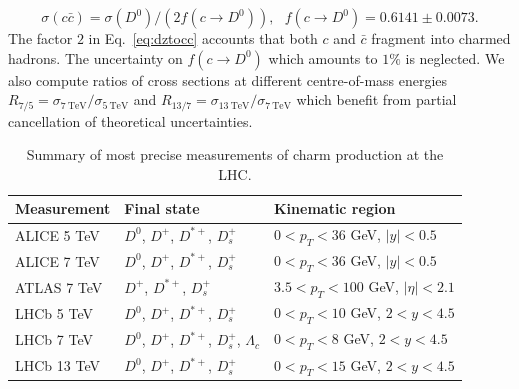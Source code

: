 \documentclass[12pt,a4paper]{article}
\newcommand{\dz}{\ensuremath{D^0}\xspace}
\newcommand{\dch}{\ensuremath{D^{+}}\xspace}
\newcommand{\dstar}{\ensuremath{D^{*+}}\xspace}
\newcommand{\ds}{\ensuremath{D_s^{+}}\xspace}
\newcommand{\lamc}{\ensuremath{\Lambda_{c}}\xspace}
\begin{document}
\begin{equation}
\sigma({c\bar{c}}) = \sigma({\dz}) / (2f(c \to \dz)),~~~f(c \to \dz) = 0.6141 \pm 0.0073.
\label{eq:dztocc}
\end{equation}
The factor $2$ in Eq.~\ref{eq:dztocc} accounts that both $c$ and $\bar{c}$ fragment into charmed hadrons.
The uncertainty on $f(c \to \dz)$ which amounts to $1\%$ is neglected.
  We also compute ratios of cross sections at different centre-of-mass energies $R_{7/5} = \sigma_{7~\textrm{TeV}} / \sigma_{5~\textrm{TeV}}$ and $R_{13/7} = \sigma_{13~\textrm{TeV}} / \sigma_{7~\textrm{TeV}}$ which benefit from partial cancellation of theoretical uncertainties.
\begin{table}
\setlength{\tabcolsep}{8pt}
\renewcommand{\arraystretch}{1.35}
\begin{tabular}{lll}
    \hline
    Measurement & Final state & Kinematic region \\
    \hline
    ALICE 5 TeV~\cite{Acharya:2019mgn} & \dz, \dch, \dstar, \ds & $0 < p_T < 36$ GeV, $|y|<0.5$ \\
    ALICE 7 TeV~\cite{Acharya:2019mgn} & \dz, \dch, \dstar, \ds & $0 < p_T < 36$ GeV, $|y|<0.5$ \\
    ATLAS 7 TeV~\cite{Aad:2015zix} & \dch, \dstar, \ds & $3.5 < p_T < 100$ GeV, $|\eta|<2.1$ \\
    LHCb 5 TeV~\cite{Aaij:2016jht} & \dz, \dch, \dstar, \ds & $0 < p_T < 10$ GeV, $2<y<4.5$ \\
    LHCb 7 TeV~\cite{Aaij:2013mga} & \dz, \dch, \dstar, \ds, \lamc & $0 < p_T < 8$ GeV, $2<y<4.5$ \\
    LHCb 13 TeV~\cite{Aaij:2015bpa} & \dz, \dch, \dstar, \ds & $0 < p_T < 15$ GeV, $2<y<4.5$ \\
    \hline
\end{tabular}
\caption{Summary of most precise measurements of charm production at the LHC.}
\label{tab:charmdata}
\end{table}
\end{document}
